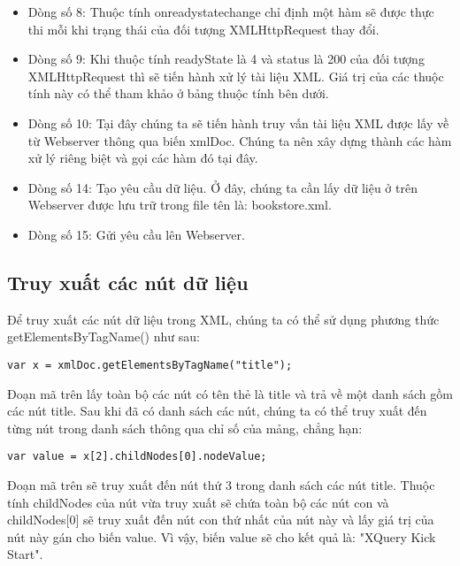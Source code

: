 \begin{itemize}
\begin{center}
\begin{longtable}{ |m{3.5cm}|m{8.5cm}| }
\end{longtable}
\end{center}
\vspace{-1cm}
\item	Dòng số 8: Thuộc tính onreadystatechange chỉ định một hàm sẽ được thực thi mỗi khi trạng thái của đối tượng XMLHttpRequest thay đổi.
\item	Dòng số 9: Khi thuộc tính readyState là 4 và status là 200 của đối tượng XMLHttpRequest thì sẽ tiến hành xử lý tài liệu XML. Giá trị của các thuộc tính này có thể tham khảo ở bảng thuộc tính bên dưới.
\item	Dòng số 10: Tại đây chúng ta sẽ tiến hành truy vấn tài liệu XML được lấy về từ Webserver thông qua biến xmlDoc. Chúng ta nên xây dựng thành các hàm xử lý riêng biệt và gọi các hàm đó tại đây. 
\item	Dòng số 14: Tạo yêu cầu dữ liệu. Ở đây, chúng ta cần lấy dữ liệu ở trên Webserver được lưu trữ trong file tên là: bookstore.xml.
\item	Dòng số 15: Gửi yêu cầu lên Webserver.

\end{itemize}





\subsection{Truy xuất các nút dữ liệu }
Để truy xuất các nút dữ liệu trong XML, chúng ta có thể sử dụng phương thức {\ttfamily  getElementsByTagName()} như sau:
\lstset{language=XML}
\begin{lstlisting}[escapechar=`]
	var x = xmlDoc.getElementsByTagName("title");
\end{lstlisting}

Đoạn mã trên lấy toàn bộ các nút có tên thẻ là {\ttfamily title} và trả về một danh sách gồm các nút {\ttfamily title}. Sau khi đã có danh sách các nút, chúng ta có thể truy xuất đến từng nút trong danh sách thông qua chỉ số của mảng, chẳng hạn:
\lstset{language=XML}
\begin{lstlisting}[escapechar=`]
	var value = x[2].childNodes[0].nodeValue;
\end{lstlisting}

Đoạn mã trên sẽ truy xuất đến nút thứ 3 trong danh sách các nút title. Thuộc tính {\ttfamily childNodes} của nút vừa truy xuất sẽ chứa toàn bộ các nút con và {\ttfamily childNodes[0]} sẽ truy xuất đến nút con thứ nhất của nút này và lấy giá trị của nút này gán cho biến {\ttfamily value}. Vì vậy, biến value sẽ cho kết quả là: {\ttfamily "XQuery Kick Start"}. 

